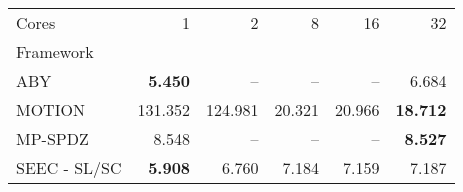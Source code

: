 \begin{tabular}{lrrrrr}
\toprule
Cores & 1 & 2 & 8 & 16 & 32 \\
Framework &  &  &  &  &  \\
\midrule
ABY~\cite{DSZ15} & \bfseries 5.450 & -- & -- & -- & 6.684 \\
MOTION~\cite{BDST22} & 131.352 & 124.981 & 20.321 & 20.966 & \bfseries 18.712 \\
MP-SPDZ~\cite{CCS:Keller20} & 8.548 & -- & -- & -- & \bfseries 8.527 \\
SEEC - SL/SC & \bfseries 5.908 & 6.760 & 7.184 & 7.159 & 7.187 \\
\bottomrule
\end{tabular}
